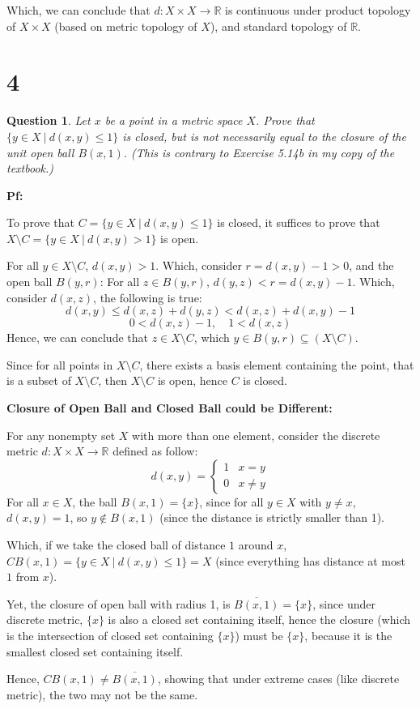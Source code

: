 \documentclass{article}
\newtheorem{question}{Question}
\begin{document}
Which, we can conclude that $d:X\times X\rightarrow \mathbb{R}$ is continuous under product topology of $X\times X$ (based on metric topology of $X$), and standard topology of $\mathbb{R}$.

\break

\section*{4}
\begin{myBox}[]{}
    \begin{question}
        Let $x$ be a point in a metric space $X$. Prove that $\{y\in X\ |\ d(x,y)\leq 1\}$ is
        closed, but is not necessarily equal to the closure of the unit open ball $B(x, 1)$.
        (This is contrary to Exercise 5.14b in my copy of the textbook.)
    \end{question}
\end{myBox}

\textbf{Pf:}

To prove that $C=\{y\in X\ |\ d(x,y)\leq 1\}$ is closed, it suffices to prove that $X\setminus C = \{y\in X\ |\ d(x,y)>1\}$ is open.

For all $y\in X\setminus C$, $d(x,y)>1$. Which, consider $r=d(x,y)-1>0$, and the open ball $B(y,r)$:
For all $z\in B(y,r)$, $d(y,z) < r = d(x,y)-1$. Which, consider $d(x,z)$, the following is true:
$$d(x,y) \leq d(x,z)+d(y,z) < d(x,z)+d(x,y)-1$$
$$0 < d(x,z)-1,\quad 1<d(x,z)$$
Hence, we can conclude that $z\in X\setminus C$, which $y\in B(y,r)\subseteq (X\setminus C)$.

Since for all points in $X\setminus C$, there exists a basis element containing the point, that is a subset of $X\setminus C$,
then $X\setminus C$ is open, hence $C$ is closed.

\hfill

\textbf{Closure of Open Ball and Closed Ball could be Different:}

For any nonempty set $X$ with more than one element, consider the discrete metric $d:X\times X\rightarrow \mathbb{R}$ defined as follow:
$$d(x,y)=\begin{cases}
    1 & x=y\\
    0 & x\neq y
\end{cases}$$
For all $x\in X$, the ball $B(x,1)=\{x\}$, since for all $y\in X$ with $y\neq x$, $d(x,y)=1$, so $y \notin B(x,1)$ (since the distance is strictly smaller than 1).

Which, if we take the closed ball of distance $1$ around $x$, $CB(x,1)=\{y\in X\ |\ d(x,y)\leq 1\}=X$ (since everything has distance at most $1$ from $x$).

Yet, the closure of open ball with radius 1, is $\overline{B(x,1)}=\{x\}$, since under discrete metric,
$\{x\}$ is also a closed set containing itself, hence the closure (which is the intersection of closed set containing $\{x\}$) must be $\{x\}$,
because it is the smallest closed set containing itself.

Hence, $CB(x,1)\neq \overline{B(x,1)}$, showing that under extreme cases (like discrete metric), the two may not be the same.
\end{document}
